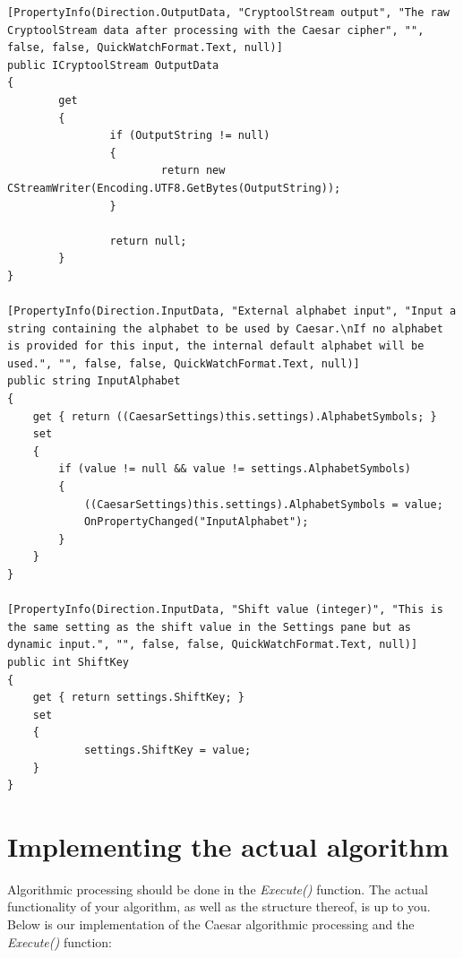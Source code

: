 \begin{lstlisting}
[PropertyInfo(Direction.OutputData, "CryptoolStream output", "The raw CryptoolStream data after processing with the Caesar cipher", "", false, false, QuickWatchFormat.Text, null)]
public ICryptoolStream OutputData
{
		get
		{
				if (OutputString != null)
				{                    
						return new CStreamWriter(Encoding.UTF8.GetBytes(OutputString));
				}

				return null;
		}
}

[PropertyInfo(Direction.InputData, "External alphabet input", "Input a string containing the alphabet to be used by Caesar.\nIf no alphabet is provided for this input, the internal default alphabet will be used.", "", false, false, QuickWatchFormat.Text, null)]
public string InputAlphabet
{
	get { return ((CaesarSettings)this.settings).AlphabetSymbols; }
	set
	{
		if (value != null && value != settings.AlphabetSymbols)
		{
			((CaesarSettings)this.settings).AlphabetSymbols = value;
			OnPropertyChanged("InputAlphabet");
		}
	}
}

[PropertyInfo(Direction.InputData, "Shift value (integer)", "This is the same setting as the shift value in the Settings pane but as dynamic input.", "", false, false, QuickWatchFormat.Text, null)]
public int ShiftKey
{
	get { return settings.ShiftKey; }
	set
	{
			settings.ShiftKey = value;
	}
}
\end{lstlisting}

\section{Implementing the actual algorithm}
\label{sec:ImplementingTheActualAlgorithm}

Algorithmic processing should be done in the \textit{Execute()} function. The actual functionality of your algorithm, as well as the structure thereof, is up to you. Below is our implementation of the Caesar algorithmic processing and the \textit{Execute()} function:

